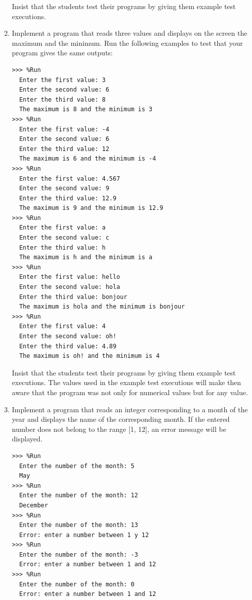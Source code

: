 \documentclass[
  fontsize=10pt,
  a4paper,
]{scrartcl}
\newenvironment{howTILEd}%
  {\begin{mdframed}[skipabove=10pt,skipbelow=10pt,backgroundcolor=pink!40]}%
  {\end{mdframed}}
\begin{document}
\begin{enumerate}
\begin{howTILEd}
Insist that the students test their programs by giving them example test executions.
\end{howTILEd}

\item Implement a program that reads three values and displays on the screen the maximum and the minimum. Run the following examples to test that your program gives the same outputs:

\begin{small}
\begin{Verbatim}[frame=single, label={\em examples of test executions}]
>>> %Run 
  Enter the first value: 3
  Enter the second value: 6
  Enter the third value: 8
  The maximum is 8 and the minimum is 3
>>> %Run 
  Enter the first value: -4
  Enter the second value: 6
  Enter the third value: 12
  The maximum is 6 and the minimum is -4
>>> %Run
  Enter the first value: 4.567
  Enter the second value: 9
  Enter the third value: 12.9
  The maximum is 9 and the minimum is 12.9
>>> %Run 
  Enter the first value: a
  Enter the second value: c
  Enter the third value: h
  The maximum is h and the minimum is a
>>> %Run 
  Enter the first value: hello
  Enter the second value: hola
  Enter the third value: bonjour
  The maximum is hola and the minimum is bonjour
>>> %Run 
  Enter the first value: 4
  Enter the second value: oh!
  Enter the third value: 4.89
  The maximum is oh! and the minimum is 4
\end{Verbatim}
\end{small}

\begin{howTILEd}
Insist that the students test their programs by giving them example test executions. The values used in the example test executions will make then aware that the program was not only for numerical values but for any value.
\end{howTILEd}


\item Implement a program that reads an integer corresponding to a month of the year and displays the name of the corresponding month. If the entered number does not belong to the range [1, 12], an error message will be displayed.

\begin{small}
\begin{Verbatim}[frame=single, label={\em examples of test executions}]
>>> %Run 
  Enter the number of the month: 5
  May
>>> %Run 
  Enter the number of the month: 12
  December
>>> %Run 
  Enter the number of the month: 13
  Error: enter a number between 1 y 12
>>> %Run 
  Enter the number of the month: -3
  Error: enter a number between 1 and 12
>>> %Run 
  Enter the number of the month: 0
  Error: enter a number between 1 and 12
\end{Verbatim}
\end{small}


\end{enumerate}
\end{document}
